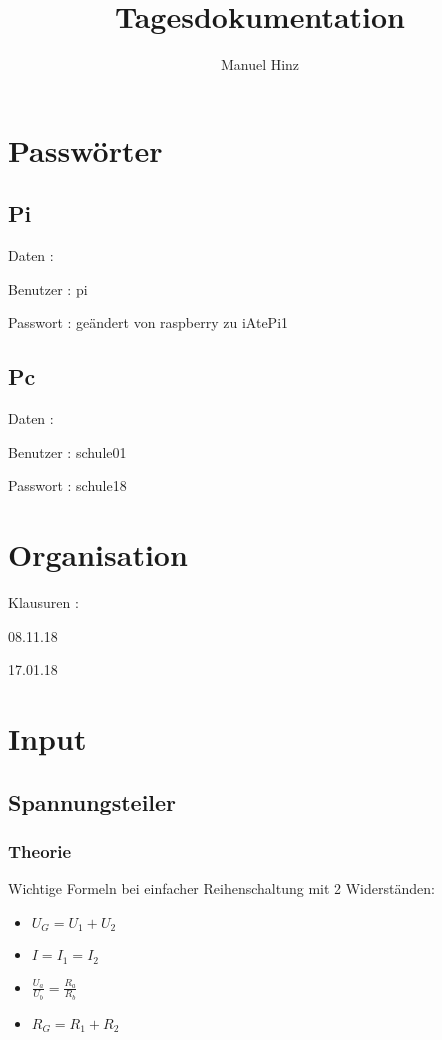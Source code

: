 \documentclass{article}
\author{Manuel Hinz}
\title{Tagesdokumentation}
\begin{document}
\maketitle


\section{Passw\"{o}rter}

\subsection{Pi}

Daten : 

Benutzer : pi

Passwort :  ge\"{a}ndert von raspberry zu iAtePi1

\subsection{Pc}

Daten : 

Benutzer : schule01

Passwort : schule18

\section{Organisation}


Klausuren : 

08.11.18

17.01.18

\section{Input}

\subsection{Spannungsteiler}

\subsubsection{Theorie}

Wichtige Formeln bei einfacher Reihenschaltung mit 2 Widerst\"{a}nden: 

\begin{itemize}

\item $U_G = U_1 + U_2$

\item $I = I_1 = I_2$

\item $\frac{U_a}{U_b} = \frac{R_a}{R_b}$

\item $R_G = R_1 + R_2$

\end{itemize}
\end{document}
